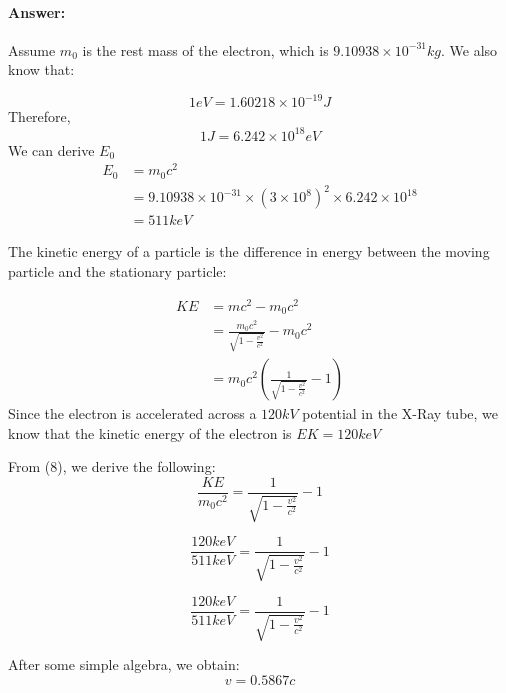 \documentclass[12pt, letter]{article}
\begin{document}
\paragraph{Answer: } Assume $m_0$ is the rest mass of the electron, which is $9.10938 \times 10^{-31} kg$. We also know that:

\begin{equation}
    1eV = 1.60218 \times 10^{-19} J
\end{equation}
Therefore,
\begin{equation}
    1J = 6.242 \times 10^{18} eV
\end{equation}
We can derive $E_0$
\begin{equation} \label{eq1}
\begin{split}
E_0 & = m_0c^2 \\
& = 9.10938 \times 10^{-31} \times (3\times10^8)^2 \times 6.242 \times 10^{18}\\
& = 511 keV
\end{split}
\end{equation}

The kinetic energy of a particle is the difference in energy between the moving particle and the stationary particle:

\begin{equation} \label{eq1}
\begin{split}
KE & = mc^2 - m_0c^2 \\
& = \frac{m_0c^2}{\sqrt{1 - \frac{v^2}{c^2}}} - m_0c^2 \\
& = m_0c^2(\frac{1}{\sqrt{1 - \frac{v^2}{c^2}}} - 1)
\end{split}
\end{equation}
Since the electron is accelerated across a $120 kV$ potential in the X-Ray tube, we know that the kinetic energy of the electron is $EK = 120keV$

From (8), we derive the following:
\begin{equation}
\frac{KE}{m_0c^2} = \frac{1}{\sqrt{1 - \frac{v^2}{c^2}}} - 1
\end{equation}

\begin{equation}
\frac{120keV}{511keV} = \frac{1}{\sqrt{1 - \frac{v^2}{c^2}}} - 1
\end{equation}

\begin{equation}
\frac{120keV}{511keV} = \frac{1}{\sqrt{1 - \frac{v^2}{c^2}}} - 1
\end{equation}

After some simple algebra, we obtain:
\begin{equation}
v = 0.5867c
\end{equation}
\end{document}
